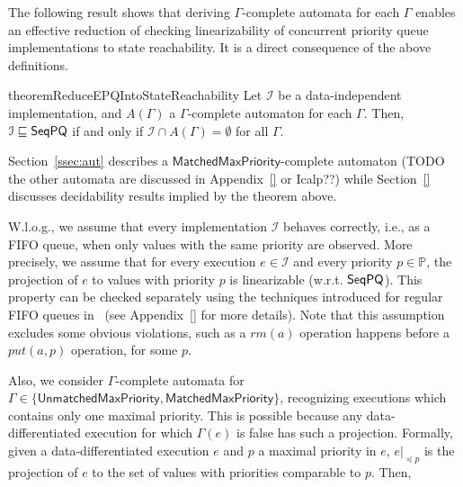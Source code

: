 The following result shows that deriving $\Gamma$-complete automata for each $\Gamma$ enables an effective reduction of checking linearizability of concurrent priority queue implementations to state reachability. It is a direct consequence of the above definitions.

\begin{restatable}{theorem}{ReduceEPQIntoStateReachability}
\label{lemma:reduce EPQ into state reachability}
Let $\mathcal{I}$ be a data-independent implementation, and $A(\Gamma)$ a $\Gamma$-complete automaton for each $\Gamma$. Then,
$\mathcal{I} \sqsubseteq \mathsf{SeqPQ}$ if and only if $\mathcal{I} \cap A(\Gamma) = \emptyset$ for all $\Gamma$.
\end{restatable}

Section~\ref{ssec:aut} describes a $\mathsf{MatchedMaxPriority}$-complete automaton (TODO the other automata are discussed in Appendix~\ref{} or Icalp??) while Section~\ref{} discusses decidability results implied by the theorem above.

W.l.o.g., we assume that every implementation $\mathcal{I}$ behaves correctly, i.e., as a FIFO queue, when only values with the same priority are observed. More precisely, we assume that for every execution $e\in\mathcal{I}$ and every priority $p\in\mathbb{P}$, the projection of $e$ to values with priority $p$ is linearizable (w.r.t. $\mathsf{SeqPQ}$). This property can be checked separately using the techniques introduced for regular FIFO queues in~\cite{DBLP:conf/icalp/BouajjaniEEH15} (see Appendix~\ref{} for more details). Note that this assumption excludes some obvious violations, such as a $\textit{rm}(a)$ operation happens before a $\textit{put}(a,p)$ operation, for some $p$.

Also, we consider $\Gamma$-complete automata for $\Gamma\in \{\mathsf{UnmatchedMaxPriority}, \mathsf{MatchedMaxPriority}\}$, recognizing executions which contains only one maximal priority. This is possible because any data-differentiated execution for which $\Gamma(e)$ is false has such a projection.
Formally, given a data-differentiated execution $e$ and $p$ a maximal priority in $e$, $e\vert_{\preceq p}$ is the projection of $e$ to the set of values with priorities comparable to $p$. Then,

